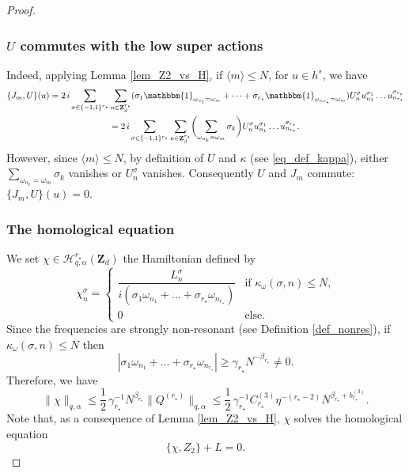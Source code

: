 \documentclass[JEP,XML,SOM,Unicode,NoEqCountersInSection,published]{cedram}
\theoremstyle{definition}
\begin{document}
\begin{proof}
\subsubsection*{$U$ commutes with the low super actions}
Indeed, applying Lemma \ref{lem_Z2_vs_H}, if $\langle m \rangle\leq N$, for $u\in h^s$, we have
\begin{multline*}
\{ J_m, U \}(u) =2 \, i \sum_{\sigma \in \{-1,1\}^{r_\star}} \sum_{n\in \mathbf{Z}_d^{r_\star} } (\sigma_1 \mathbbm{1}_{\omega_{n_1}=\omega_m} + \dots + \sigma_{r_\star} \mathbbm{1}_{\omega_{n_{r_\star}}=\omega_m}) U_{n}^{\sigma} u_{n_1}^{\sigma_1} \dots u_{n_{r_\star}}^{\sigma_{r_\star}}
\\
=2 \, i \sum_{\sigma \in \{-1,1\}^{r_\star}} \sum_{n\in \mathbf{Z}_d^{r_\star} } \biggl(\sum_{\omega_{n_k}=\omega_{m}} \sigma_k\biggr) U_{n}^{\sigma} u_{n_1}^{\sigma_1} \dots u_{n_{r_\star}}^{\sigma_{r_\star}}.
\end{multline*}
However, since $ \langle m \rangle \leq N$, by definition of $U$ and $\kappa$ (see \eqref{eq_def_kappa}), either $\sum_{\omega_{n_k}=\omega_{m}} \sigma_k$ vanishes or $U_{n}^{\sigma}$ vanishes. Consequently $U$ and $J_m$ commute: $\{ J_m, U \}(u)=0$.

\subsubsection*{The homological equation}
We set $\chi \in \mathscr{H}_{q,\alpha}^{r_\star}(\mathbf{Z}_d)$ the Hamiltonian defined by
\[
\chi_n^\sigma =
\begin{cases}
\dfrac{L_n^\sigma}{i(\sigma_1 \omega_{n_1} + \dots + \sigma_{r_\star} \omega_{n_{r_\star}})}& \text{if $\kappa_\omega(\sigma,n) \leq N$,}\\
0&\text{else}.
\end{cases}
\]
Since the frequencies are strongly non-resonant (see Definition \ref{def_nonres}), if $\kappa_\omega(\sigma,n) \leq N$ then
\[
|\sigma_1 \omega_{n_1} + \dots + \sigma_{r_\star} \omega_{n_{r_\star}} |\geq \gamma_{r_\star} N^{-\beta_{r_\star}} \neq 0.
\]
Therefore, we have
\begin{equation}
\label{eq_bound_on_chi}
\| \chi\|_{q,\alpha} \leq \frac12\, \gamma_{r_\star}^{-1} N^{\beta_{r_\star}} \|Q^{(r_\star)} \|_{q,\alpha}\leq \frac12\, \gamma_{r_\star}^{-1} C_{r_\star}^{(3)} \eta^{-(r_\star-2)} N^{\beta_{r_\star}+ b_{r_\star}^{(3)}}.
\end{equation}
Note that, as a consequence of Lemma \ref{lem_Z2_vs_H}, $\chi$ solves the homological equation
\[
\{ \chi, Z_2\} + L =0.
\]


\end{proof}
\end{document}
